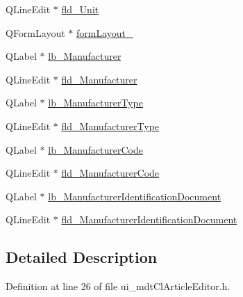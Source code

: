 \begin{DoxyCompactItemize}
\item 
Q\-Line\-Edit $\ast$ \hyperlink{class_ui__mdt_cl_article_editor_a75c92c53cd2ce801cd5bb48a0f501216}{fld\-\_\-\-Unit}
\item 
Q\-Form\-Layout $\ast$ \hyperlink{class_ui__mdt_cl_article_editor_a259a2c31f44e1446bf1ba9dcf5d103a2}{form\-Layout\-\_}
\item 
Q\-Label $\ast$ \hyperlink{class_ui__mdt_cl_article_editor_a2c5601307a68a638f76742b9e8e84d65}{lb\-\_\-\-Manufacturer}
\item 
Q\-Line\-Edit $\ast$ \hyperlink{class_ui__mdt_cl_article_editor_a4386172547c12e054a0d72b08c240d19}{fld\-\_\-\-Manufacturer}
\item 
Q\-Label $\ast$ \hyperlink{class_ui__mdt_cl_article_editor_a982f02bbff1bdfd1e45f549456d48780}{lb\-\_\-\-Manufacturer\-Type}
\item 
Q\-Line\-Edit $\ast$ \hyperlink{class_ui__mdt_cl_article_editor_ac3182773dbe0e49bbc82ea9aa967b1b3}{fld\-\_\-\-Manufacturer\-Type}
\item 
Q\-Label $\ast$ \hyperlink{class_ui__mdt_cl_article_editor_aee4c86d3633977d067a9c9ae32f09386}{lb\-\_\-\-Manufacturer\-Code}
\item 
Q\-Line\-Edit $\ast$ \hyperlink{class_ui__mdt_cl_article_editor_ae1e1fcfc8515251d4395b4909292ca10}{fld\-\_\-\-Manufacturer\-Code}
\item 
Q\-Label $\ast$ \hyperlink{class_ui__mdt_cl_article_editor_ab4614dfa23e032d737d987ebb2ae109c}{lb\-\_\-\-Manufacturer\-Identification\-Document}
\item 
Q\-Line\-Edit $\ast$ \hyperlink{class_ui__mdt_cl_article_editor_adbf2f36e8f78d0371cd4f2b7b9fc06ad}{fld\-\_\-\-Manufacturer\-Identification\-Document}
\end{DoxyCompactItemize}


\subsection{Detailed Description}


Definition at line 26 of file ui\-\_\-mdt\-Cl\-Article\-Editor.\-h.



